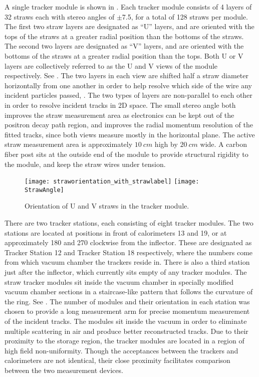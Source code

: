 A single tracker module is shown in . Each tracker module consists of 4 layers of 32 straws each with stereo angles of $\pm$7.5\textdegree{}, for a total of 128 straws per module. The first two straw layers are designated as ``U'' layers, and are oriented with the tops of the straws at a greater radial position than the bottoms of the straws. The second two layers are designated as ``V'' layers, and are oriented with the bottoms of the straws at a greater radial position than the tops. Both U or V layers are collectively referred to as the U and V views of the module respectively. See . The two layers in each view are shifted half a straw diameter horizontally from one another in order to help resolve which side of the wire any incident particles passed, . The two types of layers are non-parallel to each other in order to resolve incident tracks in 2D space. The small stereo angle both improves the straw measurement area as electronics can be kept out of the positron decay path region, and improves the radial momentum resolution of the fitted tracks, since both views measure mostly in the horizontal plane. The active straw measurement area is approximately $\SI{10}{cm}$ high by $\SI{20}{cm}$ wide. A carbon fiber post sits at the outside end of the module to provide structural rigidity to the module, and keep the straw wires under tension. 



\begin{figure}[]
\centering
        \texttt{[image: straworientation\_with\_strawlabel]}
    \hspace{1cm}
        \texttt{[image: StrawAngle]}
\caption[Tracker module coordinate system]{Orientation of U and V straws in the tracker module.}
\label{fig:trackermodulecoordsys}
\end{figure}



There are two tracker stations, each consisting of eight tracker modules. The two stations are located at positions in front of calorimeters 13 and 19, or at approximately 180\textdegree{} and 270\textdegree{} clockwise from the inflector. These are designated as Tracker Station 12 and Tracker Station 18 respectively, where the numbers come from which vacuum chamber the trackers reside in. There is also a third station just after the inflector, which currently sits empty of any tracker modules. The straw tracker modules sit inside the vacuum chamber in specially modified vacuum chamber sections in a staircase-like pattern that follows the curvature of the ring. See . The number of modules and their orientation in each station was chosen to provide a long measurement arm for precise momentum measurement of the incident tracks. The modules sit inside the vacuum in order to eliminate multiple scattering in air and produce better reconstructed tracks. Due to their proximity to the storage region, the tracker modules are located in a region of high field non-uniformity. Though the acceptances between the trackers and calorimeters are not identical, their close proximity facilitates comparison between the two measurement devices. 


